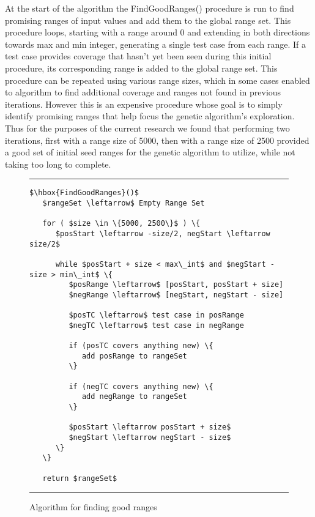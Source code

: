 \documentclass[runningheads]{llncs}
\begin{document}
At the start of the algorithm the FindGoodRanges() procedure is run to find promising ranges of input values and add them to the global range set. This procedure loops, starting with a range around 0 and extending in both directions towards max and min integer, generating a single test case from each range. If a test case provides coverage that hasn't yet been seen during this initial procedure, its corresponding range is added to the global range set. This procedure can be repeated using various range sizes, which in some cases enabled to algorithm to find additional coverage and ranges not found in previous iterations. However this is an expensive procedure whose goal is to simply identify promising ranges that help focus the genetic algorithm's exploration. Thus for the purposes of the current research we found that performing two iterations, first with a range size of 5000, then with a range size of 2500 provided a good set of initial seed ranges for the genetic algorithm to utilize, while not taking too long to complete.
\begin{figure}[h!]
\begin{center}
\hrule
\medskip
\begin{Verbatim}[fontfamily=tt, xleftmargin=10pt, commandchars=\\\{\},
   codes={\catcode`$=3\catcode`^=7\catcode`_=8}]
$\hbox{FindGoodRanges}()$  
   $rangeSet \leftarrow$ Empty Range Set

   for ( $size \in \{5000, 2500\}$ ) \{
      $posStart \leftarrow -size/2, negStart \leftarrow size/2$

      while $posStart + size < max\_int$ and $negStart - size > min\_int$ \{
         $posRange \leftarrow$ [posStart, posStart + size]
         $negRange \leftarrow$ [negStart, negStart - size]

         $posTC \leftarrow$ test case in posRange
         $negTC \leftarrow$ test case in negRange

         if (posTC covers anything new) \{
            add posRange to rangeSet
         \}

         if (negTC covers anything new) \{
            add negRange to rangeSet
         \}
         
         $posStart \leftarrow posStart + size$
         $negStart \leftarrow negStart - size$
      \}
   \}
 
   return $rangeSet$
\end{Verbatim}
\hrule
\end{center}
\caption{Algorithm for finding good ranges \label{fig:ranges}}
\end{figure}
\end{document}
